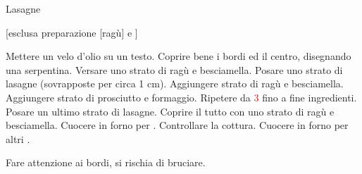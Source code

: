 \begin{recipe}{Lasagne}
    \begin{header}
    
        [esclusa preparazione [ragù] e ]
    \end{header}
    
    \begin{ingredients}
    \end{ingredients}
    
    \begin{preparation}
        \step Mettere un velo d'olio su un testo. Coprire bene i bordi ed il centro, disegnando una serpentina.
        \step Versare uno strato di ragù e besciamella.
        \step Posare uno strato di lasagne (sovrapposte per circa 1 cm).
        \step Aggiungere strato di ragù e besciamella.
        \step Aggiungere strato di prosciutto e formaggio.
        \step Ripetere da \textcolor{red}{3} fino a fine ingredienti.
        \step Posare un ultimo strato di lasagne.
        \step Coprire il tutto con uno strato di ragù e besciamella.
        \step Cuocere in forno per .
        \step Controllare la cottura.
        \step Cuocere in forno per altri .
    \end{preparation}
    
    \begin{suggestion}
        \suggestionMark Fare attenzione ai bordi, si rischia di bruciare.
    \end{suggestion}
\end{recipe}
